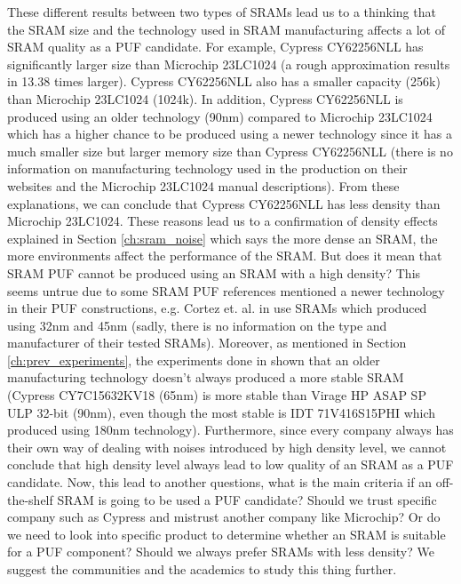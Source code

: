 These different results between two types of SRAMs lead us to a thinking that the SRAM size and the technology used in SRAM manufacturing affects a lot of SRAM quality as a PUF candidate. For example, Cypress CY62256NLL has significantly larger size than Microchip 23LC1024 (a rough approximation results in 13.38 times larger). Cypress CY62256NLL also has a smaller capacity (256k) than Microchip 23LC1024 (1024k). In addition, Cypress CY62256NLL is produced using an older technology (90nm) compared to Microchip 23LC1024 which has a higher chance to be produced using a newer technology since it has a much smaller size but larger memory size than Cypress CY62256NLL (there is no information on manufacturing technology used in the production on their websites and the Microchip 23LC1024 manual descriptions). From these explanations, we can conclude that Cypress CY62256NLL has less density than Microchip 23LC1024. These reasons lead us to a confirmation of density effects  explained in Section \ref{ch:sram_noise} which says the more dense an SRAM, the more environments affect the performance of the SRAM. But does it mean that SRAM PUF cannot be produced using an SRAM with a high density? This seems untrue due to some SRAM PUF references mentioned a newer technology in their PUF constructions, e.g. Cortez et. al. in \cite{7102498} use SRAMs which produced using 32nm and 45nm (sadly, there is no information on the type and manufacturer of their tested SRAMs). Moreover, as mentioned in Section \ref{ch:prev_experiments}, the experiments done in \cite{Schrijen:2012:CAS:2492708.2493033} shown that an older manufacturing technology doesn't always produced a more stable SRAM (Cypress CY7C15632KV18 (65nm) is more stable than Virage HP ASAP SP ULP 32-bit (90nm), even though the most stable is IDT 71V416S15PHI which produced using 180nm technology).
Furthermore, since every company always has their own way of dealing with noises introduced by high density level, we cannot conclude that high density level always lead to low quality of an SRAM as a PUF candidate. Now, this lead to another questions, what is the main criteria if an off-the-shelf SRAM is going to be used a PUF candidate? Should we trust specific company such as Cypress and mistrust another company like Microchip? Or do we need to look into specific product to determine whether an SRAM is suitable for a PUF component? Should we always prefer SRAMs with less density?
We suggest the communities and the academics to study this thing further.

